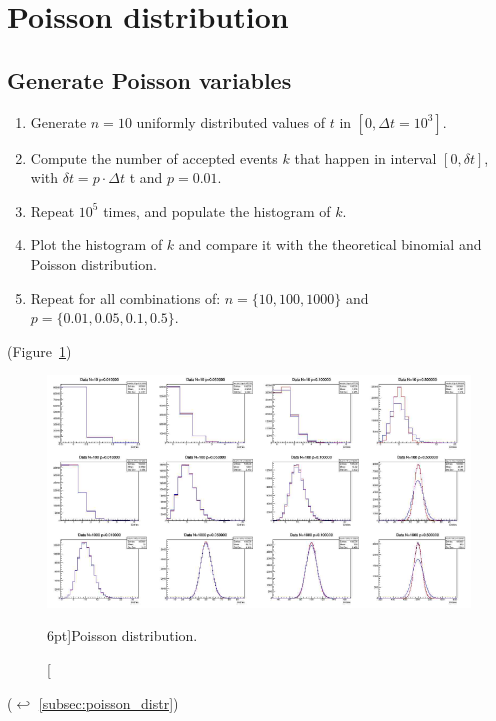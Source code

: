 

\section{Poisson distribution}
\label{exer:poisson_distr}

\subsection{Generate Poisson variables}

\begin{enumerate}
	\item Generate $n = 10$ uniformly distributed values of $t$ in $[0, \Delta t = 10^{3}]$.
	\item Compute the number of accepted events $k$ that happen in interval $[0, \delta t]$, with $\delta t = p \cdot \Delta t$ t and $p = 0.01$.
	\item Repeat $10^{5}$ times, and populate the histogram of $k$.
	\item Plot the histogram of $k$ and compare it with the theoretical binomial and Poisson distribution.
	\item Repeat for all combinations of: $n = \{ 10, 100, 1000 \}$ and $p = \{ 0.01, 0.05, 0.1, 0.5 \}$.
\end{enumerate}

(Figure~\ref{fig:Poisson_distr})

\begin{figure}
	\includegraphics{exercise/Poisson_distr.png}
	\caption[Poisson distribution.][6pt]{Poisson distribution.}
	\label{fig:Poisson_distr}
\end{figure}

($\hookleftarrow$ \ref{subsec:poisson_distr})
